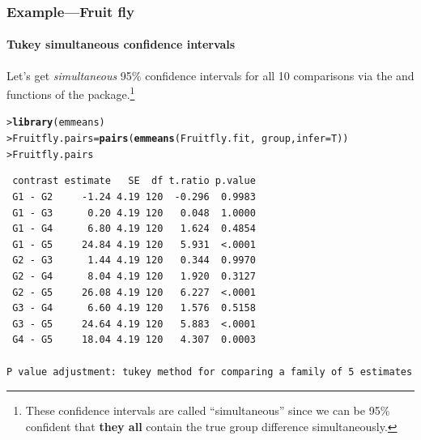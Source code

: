 \documentclass{beamer}\usepackage[]{graphicx}\usepackage[]{xcolor}
\makeatletter
\newcommand{\hlopt}[1]{\textcolor[rgb]{0,0,0}{#1}}%
\newcommand{\hlstd}[1]{\textcolor[rgb]{0.345,0.345,0.345}{#1}}%
\newcommand{\hlkwb}[1]{\textcolor[rgb]{0.69,0.353,0.396}{#1}}%
\newcommand{\hlkwc}[1]{\textcolor[rgb]{0.333,0.667,0.333}{#1}}%
\newcommand{\hlkwd}[1]{\textcolor[rgb]{0.737,0.353,0.396}{\textbf{#1}}}%
\newenvironment{kframe}{%
 \def\at@end@of@kframe{}%
 \ifinner\ifhmode%
  \def\at@end@of@kframe{\end{minipage}}%
  \begin{minipage}{\columnwidth}%
 \fi\fi%
 \def\FrameCommand##1{\hskip\@totalleftmargin \hskip-\fboxsep
 \colorbox{shadecolor}{##1}\hskip-\fboxsep
     \hskip-\linewidth \hskip-\@totalleftmargin \hskip\columnwidth}%
 \MakeFramed {\advance\hsize-\width
   \@totalleftmargin\z@ \linewidth\hsize
   \@setminipage}}%
 {\par\unskip\endMakeFramed%
 \at@end@of@kframe}
\newenvironment{knitrout}{}{} %
\makeatother
\begin{document}
\begin{frame}[fragile]
\frametitle{Example---Fruit fly}
\framesubtitle{Tukey simultaneous confidence intervals}

Let's get {\em simultaneous} 95\% confidence intervals for all 10 comparisons via the  and  functions of the  package.\footnote{These confidence intervals are called ``simultaneous'' since we can be 95\% confident that {\bf they all} contain the true group difference simultaneously.}


\begin{knitrout}\scriptsize
{}\color{fgcolor}\begin{kframe}
\begin{alltt}
\hlstd{> }\hlkwd{library}\hlstd{(emmeans)}
\hlstd{> }\hlstd{Fruitfly.pairs} \hlkwb{=} \hlkwd{pairs}\hlstd{(}\hlkwd{emmeans}\hlstd{(Fruitfly.fit,} \hlopt{~}\hlstd{group,} \hlkwc{infer}\hlstd{=T))}
\hlstd{> }\hlstd{Fruitfly.pairs}
\end{alltt}
\begin{verbatim}
 contrast estimate   SE  df t.ratio p.value
 G1 - G2     -1.24 4.19 120  -0.296  0.9983
 G1 - G3      0.20 4.19 120   0.048  1.0000
 G1 - G4      6.80 4.19 120   1.624  0.4854
 G1 - G5     24.84 4.19 120   5.931  <.0001
 G2 - G3      1.44 4.19 120   0.344  0.9970
 G2 - G4      8.04 4.19 120   1.920  0.3127
 G2 - G5     26.08 4.19 120   6.227  <.0001
 G3 - G4      6.60 4.19 120   1.576  0.5158
 G3 - G5     24.64 4.19 120   5.883  <.0001
 G4 - G5     18.04 4.19 120   4.307  0.0003

P value adjustment: tukey method for comparing a family of 5 estimates 
\end{verbatim}
\end{kframe}
\end{knitrout}
\end{frame}
\end{document}
